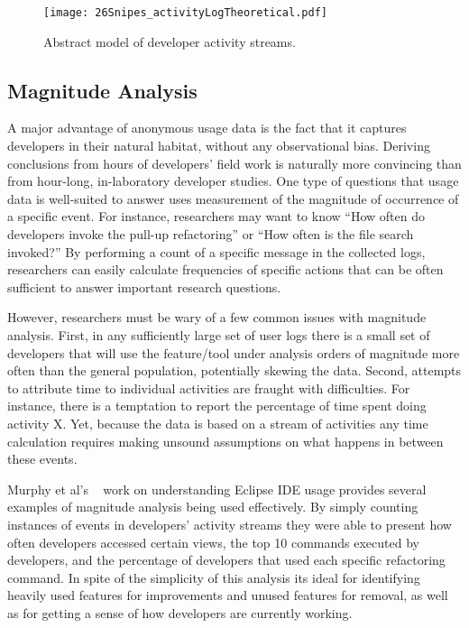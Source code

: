 \begin{figure*}[t]
 \centering
\texttt{[image: 26Snipes\_activityLogTheoretical.pdf]}
\caption{Abstract model of developer activity streams.}
\label{fig:theoretical}
\end{figure*}



\subsection{Magnitude Analysis}

A major advantage of anonymous usage data is the fact that it captures developers in their natural habitat, without any observational bias. Deriving conclusions from hours of developers' field work is naturally more convincing than from hour-long, in-laboratory developer studies. One type of questions that usage data is well-suited to answer uses measurement of the magnitude of occurrence of a specific event. For instance, researchers may want to know ``How often do developers invoke the pull-up refactoring'' or ``How often is the file search invoked?'' By performing a count of a specific message in the collected logs, researchers can easily calculate frequencies of specific actions that can be often sufficient to answer important research questions. 

However, researchers must be wary of a few common issues with magnitude analysis. First, in any sufficiently large set of user logs there is a small set of developers that will use the feature/tool under analysis orders of magnitude more often than the general population, potentially skewing the data. 
Second, attempts to attribute time to individual activities are fraught with difficulties. For instance, there is a temptation to report the percentage of time spent doing activity X. Yet, because the data is based on a stream of activities any time calculation requires making unsound assumptions on what happens in between these events.

Murphy et al's ~\citeyear{V:Murphy2006How} work on understanding Eclipse IDE usage provides several examples of magnitude analysis being used effectively. By simply counting instances of events in developers' activity streams they were able to present how often developers accessed certain views, the top 10 commands executed by developers, and the percentage of developers that used each specific refactoring command. In spite of the simplicity of this analysis its ideal for identifying heavily used features for improvements and unused features for removal, as well as for getting a sense of how developers are currently working. 

